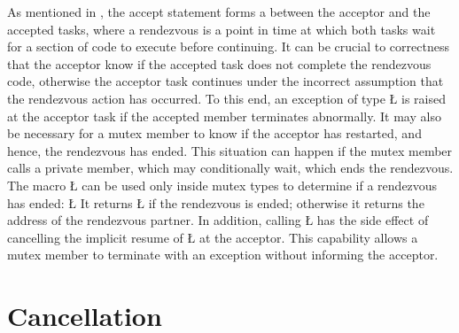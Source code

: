 \documentclass[openright,twoside]{report}
\begin{document}
As mentioned in , the accept statement forms a  between the acceptor and the accepted tasks, where a rendezvous is a point in time at which both tasks wait for a section of code to execute before continuing.
It can be crucial to correctness that the acceptor know if the accepted task does not complete the rendezvous code, otherwise the acceptor task continues under the incorrect assumption that the rendezvous action has occurred.
To this end, an exception of type \LGinlinetrue\LGbegin\lgrinde\L{}\endlgrinde\LGend{} is raised at the acceptor task if the accepted member terminates abnormally.
It may also be necessary for a mutex member to know if the acceptor has restarted, and hence, the rendezvous has ended.
This situation can happen if the mutex member calls a private member, which may conditionally wait, which ends the rendezvous.
The macro \LGinlinetrue\LGbegin\lgrinde\L{}\endlgrinde\LGend{} can be used only inside mutex types to determine if a rendezvous has ended:
\LGinlinefalse\LGbegin\lgrinde
\L{}
\endlgrinde\LGend
It returns \LGinlinetrue\LGbegin\lgrinde\L{}\endlgrinde\LGend{} if the rendezvous is ended;
otherwise it returns the address of the rendezvous partner.
In addition, calling \LGinlinetrue\LGbegin\lgrinde\L{}\endlgrinde\LGend{} has the side effect of cancelling the implicit resume of \LGinlinetrue\LGbegin\lgrinde\L{}\endlgrinde\LGend{} at the acceptor.
This capability allows a mutex member to terminate with an exception without informing the acceptor.


\chapter{Cancellation}
\label{s:Cancellation}
\end{document}
